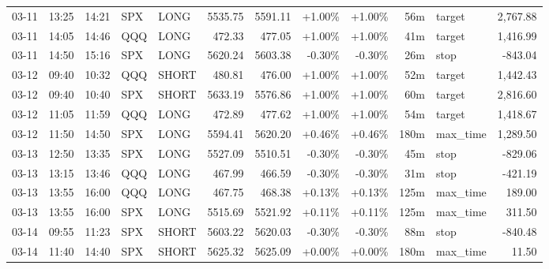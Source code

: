 \documentclass[11pt,a4paper]{article}
\begin{document}
\begin{center}
\begin{longtable}{>{\color{txtmain}}l l l l l r r r r r >{\color{txtmain}}l r}
03-11 & 13:25 & 14:21 & SPX & LONG & 5535.75 & 5591.11 & \textcolor{wingreen}{+1.00\%} & \textcolor{wingreen}{+1.00\%} & 56m & target & \textcolor{wingreen}{2,767.88} \\
03-11 & 14:05 & 14:46 & QQQ & LONG & 472.33 & 477.05 & \textcolor{wingreen}{+1.00\%} & \textcolor{wingreen}{+1.00\%} & 41m & target & \textcolor{wingreen}{1,416.99} \\
03-11 & 14:50 & 15:16 & SPX & LONG & 5620.24 & 5603.38 & \textcolor{lossred}{-0.30\%} & \textcolor{lossred}{-0.30\%} & 26m & stop & \textcolor{lossred}{-843.04} \\
03-12 & 09:40 & 10:32 & QQQ & SHORT & 480.81 & 476.00 & \textcolor{wingreen}{+1.00\%} & \textcolor{wingreen}{+1.00\%} & 52m & target & \textcolor{wingreen}{1,442.43} \\
03-12 & 09:40 & 10:40 & SPX & SHORT & 5633.19 & 5576.86 & \textcolor{wingreen}{+1.00\%} & \textcolor{wingreen}{+1.00\%} & 60m & target & \textcolor{wingreen}{2,816.60} \\
03-12 & 11:05 & 11:59 & QQQ & LONG & 472.89 & 477.62 & \textcolor{wingreen}{+1.00\%} & \textcolor{wingreen}{+1.00\%} & 54m & target & \textcolor{wingreen}{1,418.67} \\
03-12 & 11:50 & 14:50 & SPX & LONG & 5594.41 & 5620.20 & \textcolor{wingreen}{+0.46\%} & \textcolor{wingreen}{+0.46\%} & 180m & max\_time & \textcolor{wingreen}{1,289.50} \\
03-13 & 12:50 & 13:35 & SPX & LONG & 5527.09 & 5510.51 & \textcolor{lossred}{-0.30\%} & \textcolor{lossred}{-0.30\%} & 45m & stop & \textcolor{lossred}{-829.06} \\
03-13 & 13:15 & 13:46 & QQQ & LONG & 467.99 & 466.59 & \textcolor{lossred}{-0.30\%} & \textcolor{lossred}{-0.30\%} & 31m & stop & \textcolor{lossred}{-421.19} \\
03-13 & 13:55 & 16:00 & QQQ & LONG & 467.75 & 468.38 & \textcolor{wingreen}{+0.13\%} & \textcolor{wingreen}{+0.13\%} & 125m & max\_time & \textcolor{wingreen}{189.00} \\
03-13 & 13:55 & 16:00 & SPX & LONG & 5515.69 & 5521.92 & \textcolor{wingreen}{+0.11\%} & \textcolor{wingreen}{+0.11\%} & 125m & max\_time & \textcolor{wingreen}{311.50} \\
03-14 & 09:55 & 11:23 & SPX & SHORT & 5603.22 & 5620.03 & \textcolor{lossred}{-0.30\%} & \textcolor{lossred}{-0.30\%} & 88m & stop & \textcolor{lossred}{-840.48} \\
03-14 & 11:40 & 14:40 & SPX & SHORT & 5625.32 & 5625.09 & \textcolor{wingreen}{+0.00\%} & \textcolor{wingreen}{+0.00\%} & 180m & max\_time & \textcolor{wingreen}{11.50} \\

\end{longtable}
\end{center}
\end{document}
